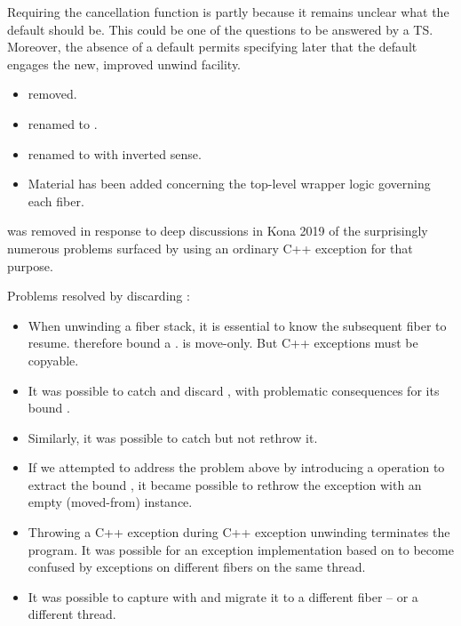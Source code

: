 Requiring the cancellation function is partly because it remains unclear what
the default should be. This could be one of the questions to be answered by a
TS. Moreover, the absence of a default permits specifying later that the
default engages the new, improved unwind facility.


\begin{itemize}
    \item {} removed.
    \item {} renamed to
      \canxtresume.
    \item {} renamed to \emptyfn with inverted
      sense.
    \item Material has been added concerning the top-level wrapper
      logic governing each fiber.
\end{itemize}

\unwindex was removed in response to deep
discussions in Kona 2019 of the surprisingly numerous problems surfaced by
using an ordinary C++ exception for that purpose.

Problems resolved by discarding \unwindex:
\begin{itemize}
    \item When unwinding a fiber stack, it is essential to know the subsequent
          fiber to resume. \unwindex therefore bound a \fiber. \fiber is
          move-only. But C++ exceptions must be copyable.
    \item It was possible to catch and discard \unwindex, with problematic
          consequences for its bound \fiber.
    \item Similarly, it was possible to catch \unwindex but not rethrow it.
    \item If we attempted to address the problem above by introducing a
          \unwindex operation to extract the bound \fiber, it became possible
          to rethrow the exception with an empty (moved-from) \fiber instance.
    \item Throwing a C++ exception during C++ exception unwinding terminates
          the program. It was possible for an exception implementation based
          on  to become confused by exceptions on different
          fibers on the same thread.
    \item It was possible to capture \unwindex with 
          and migrate it to a different fiber -- or a different thread.
\end{itemize}
